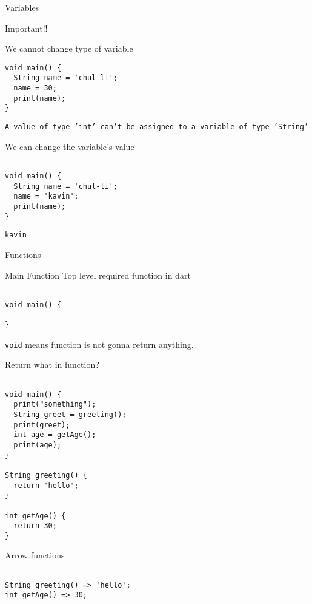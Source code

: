 \documentclass[presentation]{beamer}
\begin{document}
\begin{frame}[label={sec:orgc87552c},fragile]{Variables}
\begin{block}{Important!!}
\begin{block}{We cannot change type of variable}
\begin{verbatim}
void main() {
  String name = 'chul-li';
  name = 30;
  print(name);
}

\end{verbatim}
\texttt{A value of type 'int' can't be assigned to a variable of type 'String'}
\end{block}

\begin{block}{We can change the variable's value}
\begin{verbatim}

void main() {
  String name = 'chul-li';
  name = 'kavin';
  print(name);
}

\end{verbatim}
\texttt{kavin}
\end{block}
\end{block}
\end{frame}

\begin{frame}[label={sec:orgd957af2},fragile]{Functions}
 \begin{block}{Main Function}
Top level required function in dart
\begin{verbatim}

void main() {

}

\end{verbatim}
\texttt{void} means function is not gonna return anything.
\end{block}

\begin{block}{Return what in function?}
\begin{verbatim}

void main() {
  print("something");
  String greet = greeting();
  print(greet);
  int age = getAge();
  print(age);
}

String greeting() {
  return 'hello';
}

int getAge() {
  return 30;
}

\end{verbatim}
\end{block}

\begin{block}{Arrow functions}
\begin{verbatim}

String greeting() => 'hello';
int getAge() => 30;

\end{verbatim}
\end{block}
\end{frame}
\end{document}
